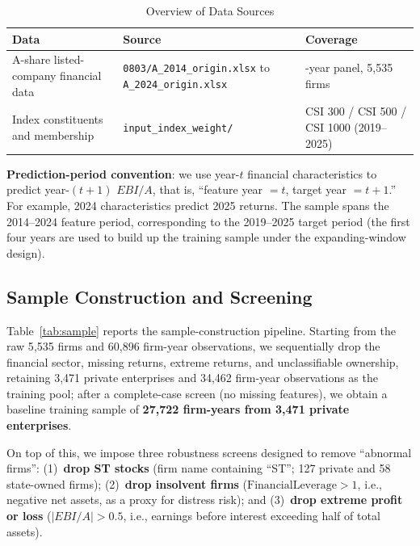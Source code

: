 \documentclass[11pt,a4paper]{article}
\begin{document}
\begin{table}[htbp]
\centering
\caption{Overview of Data Sources}
\label{tab:datasource}
\begin{threeparttable}
\small
\begin{tabularx}{\linewidth}{l >{\raggedright\arraybackslash}X >{\raggedright\arraybackslash}X}
\toprule
Data & Source & Coverage \\
\midrule
A-share listed-company financial data & \texttt{0803/A\_2014\_origin.xlsx} to \texttt{A\_2024\_origin.xlsx} & 11-year panel, 5{,}535 firms \\
Index constituents and membership & \texttt{input\_index\_weight/} & CSI 300 / CSI 500 / CSI 1000 (2019--2025) \\
\bottomrule
\end{tabularx}
\end{threeparttable}
\end{table}

\textbf{Prediction-period convention}: we use year-$t$ financial characteristics to predict year-$(t+1)$ $EBI/A$, that is, ``feature year $=t$, target year $=t+1$.'' For example, 2024 characteristics predict 2025 returns. The sample spans the 2014--2024 feature period, corresponding to the 2019--2025 target period (the first four years are used to build up the training sample under the expanding-window design).

\subsection{Sample Construction and Screening}

Table~\ref{tab:sample} reports the sample-construction pipeline. Starting from the raw 5{,}535 firms and 60{,}896 firm-year observations, we sequentially drop the financial sector, missing returns, extreme returns, and unclassifiable ownership, retaining 3{,}471 private enterprises and 34{,}462 firm-year observations as the training pool; after a complete-case screen (no missing features), we obtain a baseline training sample of \textbf{27{,}722 firm-years from 3{,}471 private enterprises}.

On top of this, we impose three robustness screens designed to remove ``abnormal firms'': (1)~\textbf{drop ST stocks} (firm name containing ``ST''; 127 private and 58 state-owned firms); (2)~\textbf{drop insolvent firms} ($\text{FinancialLeverage}>1$, i.e., negative net assets, as a proxy for distress risk); and (3)~\textbf{drop extreme profit or loss} ($|EBI/A|>0.5$, i.e., earnings before interest exceeding half of total assets).
\end{document}
